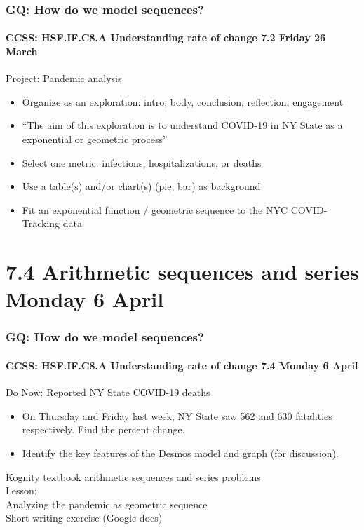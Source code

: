 \documentclass{beamer}
\begin{document}
\frame
{
  \frametitle{GQ: How do we model sequences?}
  \framesubtitle{CCSS: HSF.IF.C8.A Understanding rate of change \hfill \alert{7.2 Friday 26 March}}

  \begin{block}{Project: Pandemic analysis}
    \begin{itemize}
      \item Organize as an exploration: intro, body, conclusion, reflection, engagement
      \item ``The aim of this exploration is to understand COVID-19 in NY State as a exponential or geometric process''
      \item Select one metric: infections, hospitalizations, or deaths
      \item Use a table(s) and/or chart(s) (pie, bar) as background
      \item Fit an exponential function / geometric sequence to the NYC COVID-Tracking data
    \end{itemize}
    \end{block}
    }

\section{7.4 Arithmetic sequences and series \hfill Monday 6 April}
\frame
{
  \frametitle{GQ: How do we model sequences?}
  \framesubtitle{CCSS: HSF.IF.C8.A Understanding rate of change \hfill \alert{7.4 Monday 6 April}}
  \begin{block}{Do Now: Reported NY State COVID-19 deaths }
    \begin{itemize}
      \item On Thursday and Friday last week, NY State saw 562 and 630 fatalities respectively. Find the percent change.
      \item Identify the key features of the Desmos model and graph (for discussion).
    \end{itemize}

    \end{block}
    Kognity textbook arithmetic sequences and series problems \\[0.25cm]
    Lesson: \\
    Analyzing the pandemic as geometric sequence \\
    Short writing exercise (Google docs)
    }
\end{document}
